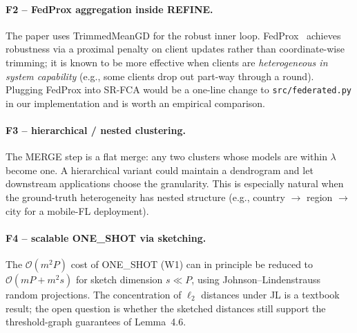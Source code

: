 \paragraph{F2 -- FedProx aggregation inside REFINE.} The paper uses TrimmedMeanGD for the robust inner loop. FedProx~\parencite{li2020heterogeneity} achieves robustness via a proximal penalty on client updates rather than coordinate-wise trimming; it is known to be more effective when clients are \emph{heterogeneous in system capability} (e.g., some clients drop out part-way through a round). Plugging FedProx into SR-FCA would be a one-line change to \texttt{src/federated.py} in our implementation and is worth an empirical comparison.

\paragraph{F3 -- hierarchical / nested clustering.} The MERGE step is a flat merge: any two clusters whose models are within $\lambda$ become one. A hierarchical variant could maintain a dendrogram and let downstream applications choose the granularity. This is especially natural when the ground-truth heterogeneity has nested structure (e.g., country $\to$ region $\to$ city for a mobile-FL deployment).

\paragraph{F4 -- scalable ONE\_SHOT via sketching.} The $\mathcal{O}(m^2 P)$ cost of ONE\_SHOT (W1) can in principle be reduced to $\mathcal{O}(m P + m^2 s)$ for sketch dimension $s \ll P$, using Johnson--Lindenstrauss random projections. The concentration of $\ell_2$ distances under JL is a textbook result; the open question is whether the sketched distances still support the threshold-graph guarantees of Lemma~4.6.
